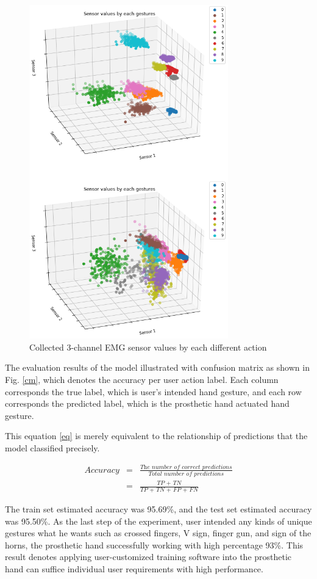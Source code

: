 \documentclass[conference]{IEEEtran}
\begin{document}
\begin{figure}[h]
  \centering
  \includegraphics[width=3.4in]{pretty_f.png}
  \caption{Collected 3-channel EMG sensor values by each different action}
  \label{3dplot}
\end{figure}


The evaluation results of the model illustrated with confusion matrix as shown in Fig. \ref{cm}, which denotes the accuracy per user action label. Each column corresponds the true label, which is user's intended hand gesture, and each row corresponds the predicted label, which is the prosthetic hand actuated hand gesture.

This equation \eqref{eq} is merely equivalent to the relationship of predictions that the model classified precisely.

\begin{eqnarray}
  Accuracy & = & \frac{\textit{The number of correct predictions}}{\textit{Total number of predictions}} \\[1ex]
   & = & \frac{\textit{TP + TN}}{\textit{TP + TN + FP + FN}}
    \label{eq}
\end{eqnarray}



The train set estimated accuracy was 95.69\%, and the test set estimated accuracy was 95.50\%. As the last step of the experiment, user intended any kinds of unique gestures what he wants such as crossed fingers, V sign, finger gun, and sign of the horns, the prosthetic hand successfully working with high percentage 93\%. This result denotes applying user-customized training software into the prosthetic hand can suffice individual user requirements with high performance.
\end{document}

